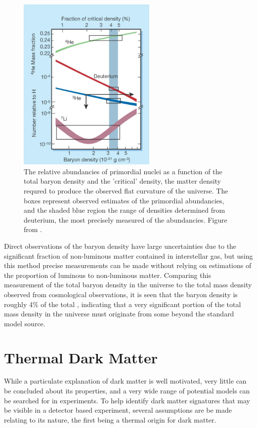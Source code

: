 \begin{figure}[htpb]
	\label{fig:baryogenesis}
	\centering
	\includegraphics[width=0.6\textwidth]{figures/baryogenesis.png}
	\caption[Relative Light Baryon Abundancies]{The relative abundancies of primordial nuclei as a function of the total baryon density and the 'critical' density, the matter density requred to produce the observed flat curvature of the universe. The boxes represent observed estimates of the primordial abundancies, and the shaded blue region the range of densities determined from deuterium, the most precisely measured of the abundancies. Figure from \cite{charbonnel2002}.}
\end{figure}

Direct observations of the baryon density have large uncertainties due to the significant fraction of non-luminous matter contained in interstellar gas, but using this method precise measurements can be made without relying on estimations of the proportion of luminous to non-luminous matter.
Comparing this measurement of the total baryon density in the universe to the total mass density observed from cosmological observations, it is seen that the baryon density is roughly 4\% of the total \cite{Tytler_2000}, indicating that a very significant portion of the total mass density in the universe must originate from some beyond the standard model source.

\section{Thermal Dark Matter}
While a particulate explanation of dark matter is well motivated, very little can be concluded about its properties, and a very wide range of potential models can be searched for in experiments.
To help identify dark matter signatures that may be visible in a detector based experiment, several assumptions are be made relating to its nature, the first being a thermal origin for dark matter.

